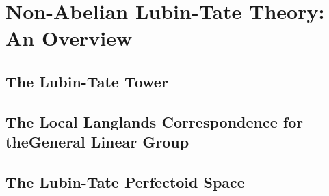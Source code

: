 \documentclass[../main.tex]{subfiles}
\begin{document}
\section{Non-Abelian Lubin-Tate Theory: An Overview} %
\label{sec:Non-Abelian Lubin-Tate Theory: An Overview}

\subsection{The Lubin-Tate Tower} %
\label{sub:The Lubin-Tate Tower}


\subsection{The Local Langlands Correspondence for theGeneral Linear Group} %
\label{sub:The Local Langlands Correspondence for theGeneral Linear Group}


\subsection{The Lubin-Tate Perfectoid Space} %
\label{sub:The Lubin-Tate Perfectoid Space}


\end{document}
